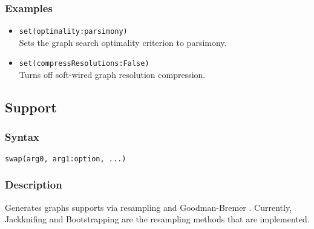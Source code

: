 \documentclass[11pt]{article}
\begin{document}
		\subsubsection{Examples}
			\begin{itemize}
					\item{\texttt{set(optimality:parsimony)}\\Sets the graph search optimality criterion to parsimony.}
					\item{\texttt{set(compressResolutions:False)}\\Turns off soft-wired graph resolution compression.}
			\end{itemize}
		
%		
	\subsection{Support}
		\subsubsection{Syntax}
		\texttt{swap(arg0, arg1:option, ...)}
		
		\subsubsection{Description}
		Generates graphs supports via resampling \citep{Farrisetal1996} and Goodman-Bremer \citep{Goodmanetal1982, bremer1994}.  Currently, Jackknifing and Bootstrapping 
		are the resampling methods that are implemented.
		
\end{document}
